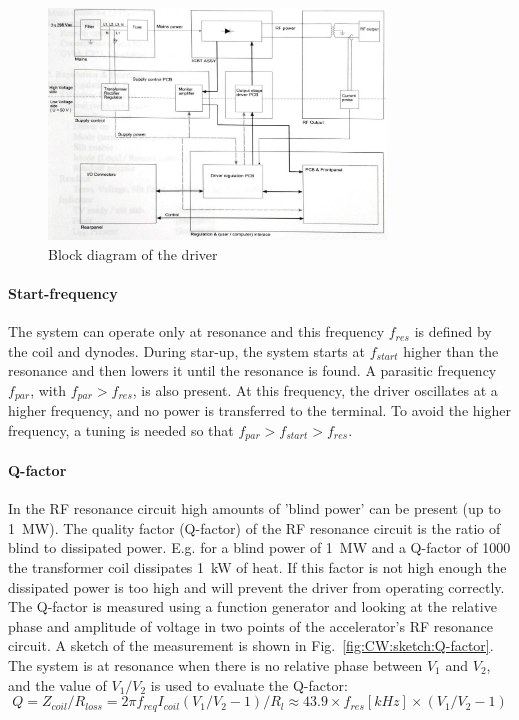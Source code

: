 \begin{refsection}
        \begin{figure}
            \centering
            \includegraphics[width=0.8\textwidth]{Figures/MEG/CW/cw_circuit_driver.jpeg}
            \caption{Block diagram of the driver}
            \label{fig:CW:circuit:driver}
        \end{figure}

        \paragraph{Start-frequency}
        The system can operate only at resonance and this frequency $f_{res}$ is defined by the coil and dynodes.
        During star-up, the system starts at $f_{start}$ higher than the resonance and then lowers it until the resonance is found.
        A parasitic frequency $f_{par}$, with $f_{par}>f_{res}$, is also present. 
        At this frequency, the driver oscillates at a higher frequency, and no power is transferred to the terminal.
        To avoid the higher frequency, a tuning is needed so that $f_{par}>f_{start}>f_{res}$.

        
        \paragraph{Q-factor} In the RF resonance circuit high amounts of 'blind power' can be present (up to \SI{1}{MW}).
        The quality factor (Q-factor) of the RF resonance circuit is the ratio of blind to dissipated power.
        E.g. for a blind power of \SI{1}{MW} and a Q-factor of 1000 the transformer coil dissipates \SI{1}{kW} of heat.
        If this factor is not high enough the dissipated power is too high and will prevent the driver from operating correctly.
        The Q-factor is measured using a function generator and looking at the relative phase and amplitude of voltage in two points of the accelerator's RF resonance circuit.
        A sketch of the measurement is shown in Fig.~\ref{fig:CW:sketch:Q-factor}.
        The system is at resonance when there is no relative phase between $V_1$ and $V_2$, and the value of $V_1/V_2$ is used to evaluate the Q-factor: 
        \begin{equation}
            Q = Z_{coil}/R_{loss} = 2\pi f_{req} I_{coil} (V_1/V_2-1)/R_l \approx 43.9\times f_{res}[kHz]\times(V_1/V_2-1)
            \label{eq:cw:qfactor}
        \end{equation}



\end{refsection}
